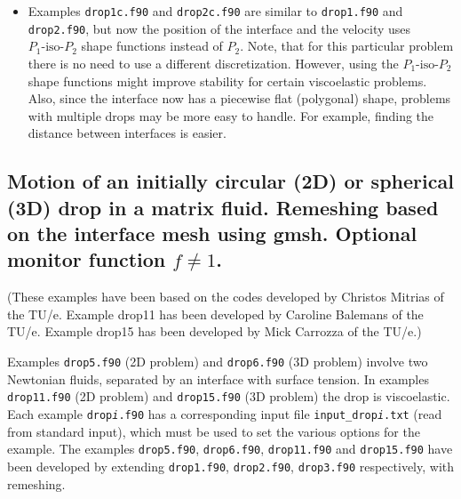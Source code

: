 \begin{itemize}
          instead of $P_2$. Note, that for this particular problem there is no need to use a different  
          discretization for the interface position. In fact, the result is even worse, especially for the 
          pressure and velocity gradients near the interface. The possibility to use a shape function for the position different from the velocity has been implemented for possible stability improvement for certain viscoelastic problems.
  \item Examples \texttt{drop1c.f90} and \texttt{drop2c.f90} are similar to
          \texttt{drop1.f90} and \texttt{drop2.f90}, but now the position of the interface and the velocity
          uses $P_1\text{-iso-}P_2$ shape functions
          instead of $P_2$. Note, that for this particular problem there is no need to use a different  
          discretization. However, using the $P_1\text{-iso-}P_2$ shape functions might improve stability for certain viscoelastic problems. Also, since the interface now has a piecewise flat (polygonal) shape,
           problems with multiple drops may be more easy to handle. For example, finding the distance between interfaces is easier. 
          
\end{itemize}

\subsection{Motion of an initially circular (2D) or spherical (3D) drop in
a matrix fluid. Remeshing based on the interface mesh using gmsh. Optional monitor function $f\neq1$.} 
\label{sec:drop_remesh}

(These examples have been based on the codes developed by Christos Mitrias of the TU/e. Example drop11 has been developed by Caroline Balemans of the TU/e. Example drop15 has been developed by Mick Carrozza of the TU/e.)

Examples \texttt{drop5.f90} (2D problem) and \texttt{drop6.f90} (3D problem) involve two Newtonian
fluids, separated by an interface with surface tension. In examples \texttt{drop11.f90} (2D problem) and \texttt{drop15.f90} (3D problem) the drop is viscoelastic.
Each example \texttt{drop\textit{i}.f90} has a corresponding input file
\texttt{input\_drop\textit{i}.txt} (read from standard input), which must be
used to set the various options for the example. The examples \texttt{drop5.f90}, \texttt{drop6.f90}, \texttt{drop11.f90} and \texttt{drop15.f90} have been developed by extending \texttt{drop1.f90}, \texttt{drop2.f90},  \texttt{drop3.f90} respectively, with remeshing.

